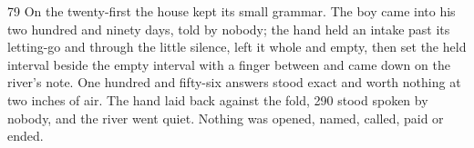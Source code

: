 \begin{CRchronicle}{79}
On the twenty-first the house kept its small grammar. The boy came into his two hundred and ninety days, told by nobody; the hand held an intake past its letting-go and through the little silence, left it whole and empty, then set the held interval beside the empty interval with a finger between and came down on the river’s note. One hundred and fifty-six answers stood exact and worth nothing at two inches of air. The hand laid back against the fold, 290 stood spoken by nobody, and the river went quiet. Nothing was opened, named, called, paid or ended.
\end{CRchronicle}
